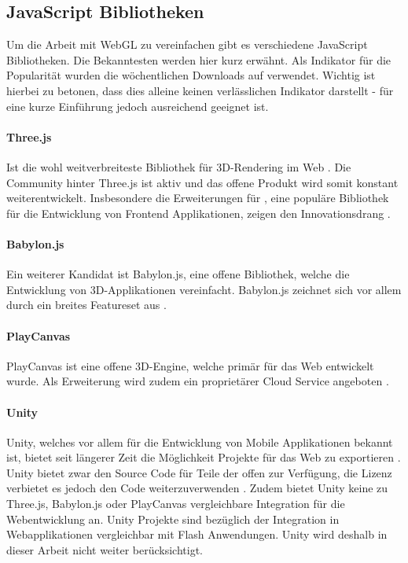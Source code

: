 \subsection{JavaScript Bibliotheken}
Um die Arbeit mit WebGL zu vereinfachen gibt es verschiedene JavaScript Bibliotheken. Die Bekanntesten werden hier kurz erwähnt. Als Indikator für die Popularität wurden die wöchentlichen Downloads auf  verwendet. Wichtig ist hierbei zu betonen, dass dies alleine keinen verlässlichen Indikator darstellt - für eine kurze Einführung jedoch ausreichend geeignet ist.

\paragraph{Three.js}
Ist die wohl weitverbreiteste Bibliothek für 3D-Rendering im Web \cite{threeNpmPackage}.
Die Community hinter Three.js ist aktiv und das offene Produkt wird somit konstant weiterentwickelt.
Insbesondere die Erweiterungen für , eine populäre Bibliothek für die Entwicklung von Frontend Applikationen, zeigen den Innovationsdrang \cite{threeFiberGithub, reactNpmPackage}.

\paragraph{Babylon.js}
Ein weiterer Kandidat ist Babylon.js, eine offene Bibliothek, welche die Entwicklung von 3D-Applikationen vereinfacht. Babylon.js zeichnet sich vor allem durch ein breites Featureset aus \cite{babylonjsNpmPackage}.

\paragraph{PlayCanvas}
PlayCanvas ist eine offene 3D-Engine, welche primär für das Web entwickelt wurde. Als Erweiterung wird zudem ein proprietärer Cloud Service angeboten \cite{playcanvasNpmPackage}.

\paragraph{Unity}
Unity, welches vor allem für die Entwicklung von Mobile Applikationen bekannt ist, bietet seit längerer Zeit die Möglichkeit Projekte für das Web zu exportieren \cite{unityWeb}.
Unity bietet zwar den Source Code für Teile der  offen zur Verfügung, die Lizenz verbietet es jedoch den Code weiterzuverwenden \cite{unityOpenSource}.
Zudem bietet Unity keine zu Three.js, Babylon.js oder PlayCanvas vergleichbare Integration für die Webentwicklung an. Unity Projekte sind bezüglich der Integration in Webapplikationen vergleichbar mit Flash Anwendungen. Unity wird deshalb in dieser Arbeit nicht weiter berücksichtigt.

